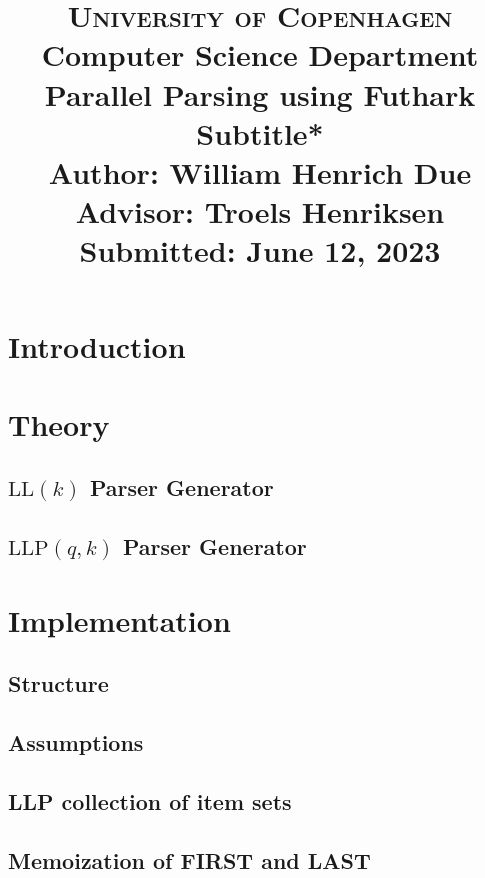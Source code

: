 \documentclass[a4paper,12pt]{article}
\title{
    {\Large \textsc{University of Copenhagen}} \\[0pt]
    {\large Computer Science Department} \\[10pt]
    {\Large Parallel Parsing using Futhark} \\[0pt]
    {\large *Subtitle*} \\[10pt]
    Author: William Henrich Due \\[0pt]
    Advisor: Troels Henriksen \\[0pt]
    Submitted: June 12, 2023
}
\author{}
\date{}
\newcommand\LL{\text{LL}}
\newcommand\LLP{\text{LLP}}
\theoremstyle{definition}
\begin{document}
\maketitle
\thispagestyle{firstpage}
\tableofcontents


\section{Introduction}

\section{Theory}
\subsection{\texorpdfstring{$\LL(k)$}{TEXT} Parser Generator}


\subsection{\texorpdfstring{$\LLP(q,k)$}{TEXT} Parser Generator}



\section{Implementation}

\subsection{Structure}


\subsection{Assumptions}


\subsection{LLP collection of item sets}


\subsection{Memoization of FIRST and LAST}

\end{document}
